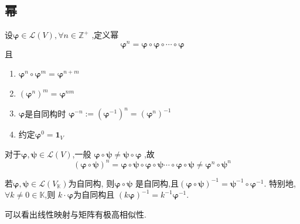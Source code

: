 \subsection{幂}
\begin{formal}
\begin{definition}[线性映射的幂]\label{def:线性映射的幂}
    设$\bm{\varphi}\in \mathcal{L} \left(
        V
    \right),\forall n \in \mathbb{Z}^+$
    ,定义幂
    \[
    \bm{\varphi}^n = \bm{\varphi} \circ\bm{\varphi}\circ\cdots \circ \bm{\varphi}
    \]
    且
    \begin{enumerate}[label=\textup{(\arabic*)}]
        \item $\bm{\varphi}^n \circ
        \bm{\varphi}^m = \bm{\varphi} ^{
            n + m
        } $
        \item $ \left(\bm{\varphi}^n\right) ^m
        = \bm{\varphi}^{nm}$
        \item $\bm{\varphi}$是自同构时
        $\bm{\varphi}^{-n}:=
        \left(\bm{\varphi}^{-1}\right) ^n
        =\left(\bm{\varphi}^n\right)^{-1}$
        \item 约定$\bm{\varphi}^0=
        \bm{1}_V$
    \end{enumerate}
\end{definition}
\end{formal}
\begin{green}
\begin{corollary}[不可交换性]\label{cor:不可交换性}
    对于$\bm{\varphi},\bm{\psi}\in
    \mathcal{L} \left(V\right)$,一般
    $\bm{\varphi}\circ \bm{\psi} 
    \neq \bm{\psi} \circ \bm{\varphi}$
    ,故
    \[
    \left(
        \bm{\varphi}\circ \bm{\psi}
    \right)^n = 
    \bm{\varphi}\circ\bm{\psi}\circ\bm{\varphi}
    \circ\bm{\psi} \cdots
    \circ\bm{\varphi}\circ\bm{\psi}
    \neq
    \bm{\varphi}^n\circ\bm{\psi}^n
    \]
\end{corollary}
\end{green}
\begin{green}
\begin{corollary}[同构保持]\label{cor:同构保持}
    若$\bm{\varphi},\bm{\psi}
    \in \mathcal{L} \left(
        V_{\mathbb{K}}
    \right)$为自同构,
    则$\bm{\varphi}\circ\bm{\psi}$
    是自同构,且$\left(\bm{\varphi \circ\psi}\right)
    ^{-1}= \bm{\psi}^{-1}\circ\bm{\varphi}^{-1}$.
    特别地,$\forall k\neq 0 \in \mathbb{K}$,则
    $k\cdot \bm{\varphi}$为自同构且
    $\left(k\bm{\varphi}\right)^{-1}=
    k^{-1}\bm{\varphi}^{-1}.$
\end{corollary}
\end{green}
\begin{red}
\begin{remark}
    可以看出线性映射与矩阵有极高相似性.
\end{remark}
\end{red}
\newpage
